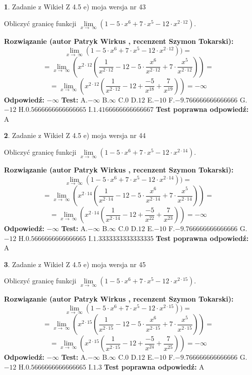 \documentclass[12pt, a4paper]{article}
\theoremstyle{definition} %
\newtheorem{zad}{}
\newcommand{\zadStart}[1]{\begin{zad}#1\newline}
\newcommand{\zadStop}{\end{zad}}
\newcommand{\rozwStart}[2]{\noindent \textbf{Rozwiązanie (autor #1 , recenzent #2): }\newline}
\newcommand{\rozwStop}{\newline}
\newcommand{\odpStart}{\noindent \textbf{Odpowiedź:}\newline}
\newcommand{\odpStop}{\newline}
\newcommand{\testStart}{\noindent \textbf{Test:}\newline}
\newcommand{\testStop}{\newline}
\newcommand{\kluczStart}{\noindent \textbf{Test poprawna odpowiedź:}\newline}
\newcommand{\kluczStop}{\newline}
\begin{document}
\zadStart{Zadanie z Wikieł Z 4.5 e) moja wersja nr 43}


Obliczyć granicę funkcji  $\lim\limits_{x\to\ \infty}(1 - 5 \cdot x^{6}+7 \cdot x^{5}- 12 \cdot x^{2\cdot12})$.
\zadStop
\rozwStart{Patryk Wirkus}{Szymon Tokarski}
$$\lim\limits_{x\to\ \infty}(1 - 5 \cdot x^{6}+7 \cdot x^{5}- 12 \cdot x^{2\cdot12}))=$$
$$=\lim\limits_{x\to\ \infty}(x^{2\cdot12}(\frac{1}{x^{2\cdot12}}-12 -5 \cdot \frac{x^{6}}{x^{2\cdot12}}+7 \cdot \frac{x^{5}}{x^{2\cdot12}}))=$$
$$=\lim\limits_{x\to\ \infty}(x^{2\cdot12}(\frac{1}{x^{2\cdot12}}-12 + \frac{-5}{x^{18}}+ \frac{7}{x^{19}}))=-\infty$$
\rozwStop
\odpStart
$-\infty$
\odpStop
\testStart
A.$-\infty$ B.$\infty$ C.$0$ D.$12$ E.$-10$
F.$-9.766666666666666$ G.$-12$
H.$0.5666666666666665$
I.$1.4166666666666667$
\testStop
\kluczStart
A
\kluczStop



\zadStart{Zadanie z Wikieł Z 4.5 e) moja wersja nr 44}


Obliczyć granicę funkcji  $\lim\limits_{x\to\ \infty}(1 - 5 \cdot x^{6}+7 \cdot x^{5}- 12 \cdot x^{2\cdot14})$.
\zadStop
\rozwStart{Patryk Wirkus}{Szymon Tokarski}
$$\lim\limits_{x\to\ \infty}(1 - 5 \cdot x^{6}+7 \cdot x^{5}- 12 \cdot x^{2\cdot14}))=$$
$$=\lim\limits_{x\to\ \infty}(x^{2\cdot14}(\frac{1}{x^{2\cdot14}}-12 -5 \cdot \frac{x^{6}}{x^{2\cdot14}}+7 \cdot \frac{x^{5}}{x^{2\cdot14}}))=$$
$$=\lim\limits_{x\to\ \infty}(x^{2\cdot14}(\frac{1}{x^{2\cdot14}}-12 + \frac{-5}{x^{22}}+ \frac{7}{x^{23}}))=-\infty$$
\rozwStop
\odpStart
$-\infty$
\odpStop
\testStart
A.$-\infty$ B.$\infty$ C.$0$ D.$12$ E.$-10$
F.$-9.766666666666666$ G.$-12$
H.$0.5666666666666665$
I.$1.3333333333333335$
\testStop
\kluczStart
A
\kluczStop



\zadStart{Zadanie z Wikieł Z 4.5 e) moja wersja nr 45}


Obliczyć granicę funkcji  $\lim\limits_{x\to\ \infty}(1 - 5 \cdot x^{6}+7 \cdot x^{5}- 12 \cdot x^{2\cdot15})$.
\zadStop
\rozwStart{Patryk Wirkus}{Szymon Tokarski}
$$\lim\limits_{x\to\ \infty}(1 - 5 \cdot x^{6}+7 \cdot x^{5}- 12 \cdot x^{2\cdot15}))=$$
$$=\lim\limits_{x\to\ \infty}(x^{2\cdot15}(\frac{1}{x^{2\cdot15}}-12 -5 \cdot \frac{x^{6}}{x^{2\cdot15}}+7 \cdot \frac{x^{5}}{x^{2\cdot15}}))=$$
$$=\lim\limits_{x\to\ \infty}(x^{2\cdot15}(\frac{1}{x^{2\cdot15}}-12 + \frac{-5}{x^{24}}+ \frac{7}{x^{25}}))=-\infty$$
\rozwStop
\odpStart
$-\infty$
\odpStop
\testStart
A.$-\infty$ B.$\infty$ C.$0$ D.$12$ E.$-10$
F.$-9.766666666666666$ G.$-12$
H.$0.5666666666666665$
I.$1.3$
\testStop
\kluczStart
A
\kluczStop
\end{document}
